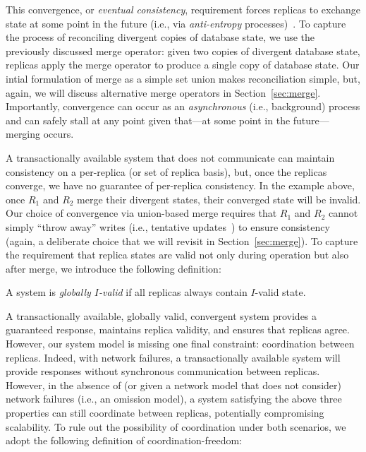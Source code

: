 This convergence, or \textit{eventual consistency}, requirement forces
replicas to exchange state at some point in the future (i.e., via
\textit{anti-entropy} processes)~\cite{vogels-defs}. To capture the
process of reconciling divergent copies of database state, we use the
previously discussed merge operator: given two copies of divergent
database state, replicas apply the merge operator to produce a single
copy of database state. Our intial formulation of merge as a simple
set union makes reconciliation simple, but, again, we will discuss
alternative merge operators in Section~\ref{sec:merge}. Importantly,
convergence can occur as an \textit{asynchronous} (i.e., background)
process and can safely stall at any point given that---at some point
in the future---merging occurs.

 A transactionally available system
that does not communicate can maintain consistency on a per-replica
(or set of replica basis), but, once the replicas converge, we have no
guarantee of per-replica consistency. In the example above, once $R_1$
and $R_2$ merge their divergent states, their converged state will be
invalid. Our choice of convergence via union-based merge requires that
$R_1$ and $R_2$ cannot simply ``throw away'' writes (i.e., tentative
updates~\cite{tamer-book}) to ensure consistency (again, a deliberate
choice that we will revisit in Section~\ref{sec:merge}). To capture
the requirement that replica states are valid not only during
operation but also after merge, we introduce the following definition:

\begin{definition}
A system is \textit{globally $I$-valid} if all replicas always contain
$I$-valid state.
\end{definition}

 A transactionally available, globally valid,
convergent system provides a guaranteed response, maintains replica
validity, and ensures that replicas agree. However, our system model
is missing one final constraint: coordination between
replicas. Indeed, with network failures, a transactionally available
system will provide responses without synchronous communication
between replicas. However, in the absence of (or given a network model
that does not consider) network failures (i.e., an omission model), a
system satisfying the above three properties can still coordinate
between replicas, potentially compromising scalability. To rule out
the possibility of coordination under both scenarios, we adopt the
following definition of coordination-freedom:

